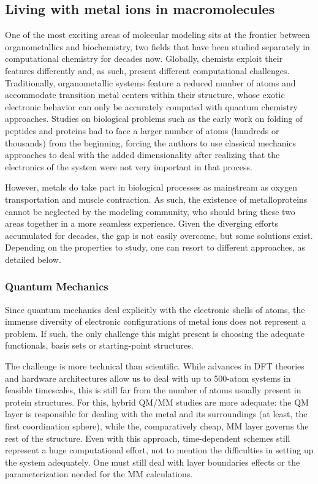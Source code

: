\subsection{Living with metal ions in macromolecules}
\label{chap:appendix-c}
One of the most exciting areas of molecular modeling sits at the frontier between organometallics and biochemistry, two fields that have been studied separately in computational chemistry for decades now. Globally, chemists exploit their features differently and, as such, present different computational challenges. Traditionally, organometallic systems feature a reduced number of atoms and accommodate transition metal centers within their structure, whose exotic electronic behavior can only be accurately computed with quantum chemistry approaches. Studies on biological problems such as the early work on folding of peptides and proteins had to face a larger number of atoms (hundreds or thousands) from the beginning, forcing the authors to use classical mechanics approaches to deal with the added dimensionality after realizing that the electronics of the system were not very important in that process.

However, metals do take part in biological processes as mainstream as oxygen transportation and muscle contraction. As such, the existence of metalloproteins cannot be neglected by the modeling community, who should bring these two areas together in a more seamless experience. Given the diverging efforts accumulated for decades, the gap is not easily overcome, but some solutions exist. Depending on the properties to study, one can resort to different approaches, as detailed below.

\subsubsection{Quantum Mechanics}
Since quantum mechanics deal explicitly with the electronic shells of atoms, the immense diversity of electronic configurations of metal ions does not represent a problem. If such, the only challenge this might present is choosing the adequate functionals, basis sets or starting-point structures.

The challenge is more technical than scientific. While advances in DFT theories and hardware architectures allow us to deal with up to 500-atom systems in feasible timescales, this is still far from the number of atoms usually present in protein structures. For this, hybrid QM/MM studies are more adequate: the QM layer is responsible for dealing with the metal and its surroundings (at least, the first coordination sphere), while the, comparatively cheap, MM layer governs the rest of the structure. Even with this approach, time-dependent schemes still represent a huge computational effort, not to mention the difficulties in setting up the system adequately. One must still deal with layer boundaries effects or the parameterization needed for the MM calculations.

